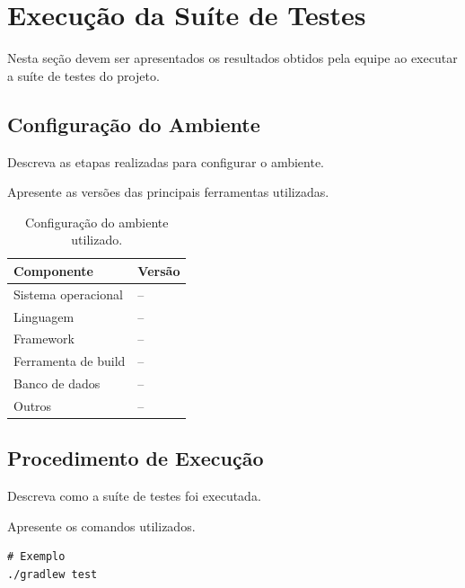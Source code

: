 \section{Execução da Suíte de Testes}

Nesta seção devem ser apresentados os resultados obtidos pela
equipe ao executar a suíte de testes do projeto.



\subsection{Configuração do Ambiente}

Descreva as etapas realizadas para configurar o ambiente.

Apresente as versões das principais ferramentas utilizadas.

\begin{table}[H]
\centering
\caption{Configuração do ambiente utilizado.}
\label{tab:ambiente}
\begin{tabularx}{\textwidth}{l X}
\toprule
\textbf{Componente} & \textbf{Versão} \\
\midrule
Sistema operacional & -- \\
Linguagem & -- \\
Framework & -- \\
Ferramenta de build & -- \\
Banco de dados & -- \\
Outros & -- \\
\bottomrule
\end{tabularx}
\end{table}



\subsection{Procedimento de Execução}

Descreva como a suíte de testes foi executada.

Apresente os comandos utilizados.

\begin{lstlisting}
# Exemplo
./gradlew test
\end{lstlisting}


